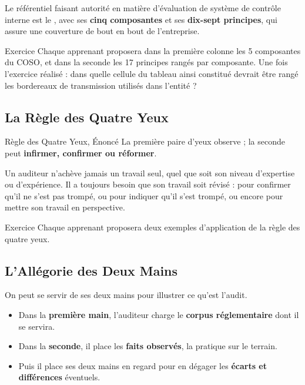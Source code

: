 Le référentiel faisant autorité en matière d'évaluation de système de contrôle interne
est le , avec ses \textbf{cinq composantes} et ses
\textbf{dix-sept principes}, qui assure une couverture de bout en bout de l'entreprise.

\begin{boxexo}{Exercice}
Chaque apprenant proposera dans la première colonne les 5 composantes du COSO,
et dans la seconde les 17 principes rangés par composante. Une fois l'exercice
réalisé : dans quelle cellule du tableau ainsi constitué devrait être rangé les
bordereaux de transmission utilisés dans l'entité ?
\end{boxexo}

\subsection{La Règle des Quatre Yeux}

\begin{boiteTheoreme}{Règle des Quatre Yeux, Énoncé}
La première paire d'yeux observe ; la seconde peut \textbf{infirmer, confirmer ou
réformer}.
\end{boiteTheoreme}

Un auditeur n'achève jamais un travail seul, quel que soit son niveau d'expertise ou
d'expérience. Il a toujours besoin que son travail soit révisé : pour confirmer qu'il ne
s'est pas trompé, ou pour indiquer qu'il s'est trompé, ou encore pour mettre son
travail en perspective.

\begin{boxexo}{Exercice}
Chaque apprenant proposera deux exemples d'application de la règle des quatre yeux.
\end{boxexo}

\subsection{L'Allégorie des Deux Mains}

On peut se servir de ses deux mains pour illustrer ce qu'est l'audit.

\begin{itemize}
  \item Dans la \textbf{première main}, l'auditeur charge le
    \textbf{corpus réglementaire} dont il se servira.
  \item Dans la \textbf{seconde}, il place les \textbf{faits observés}, la pratique
    sur le terrain.
  \item Puis il place ses deux mains en regard pour en dégager les
    \textbf{écarts et différences} éventuels.
\end{itemize}

